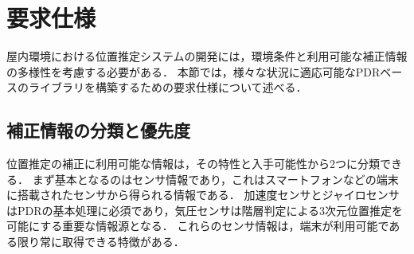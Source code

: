 



%
%
%

\section{要求仕様}

屋内環境における位置推定システムの開発には，環境条件と利用可能な補正情報の多様性を考慮する必要がある．
本節では，様々な状況に適応可能なPDRベースのライブラリを構築するための要求仕様について述べる．


\subsection{補正情報の分類と優先度}

位置推定の補正に利用可能な情報は，その特性と入手可能性から2つに分類できる．
まず基本となるのはセンサ情報であり，これはスマートフォンなどの端末に搭載されたセンサから得られる情報である．
加速度センサとジャイロセンサはPDRの基本処理に必須であり，気圧センサは階層判定による3次元位置推定を可能にする重要な情報源となる．
これらのセンサ情報は，端末が利用可能である限り常に取得できる特徴がある．

